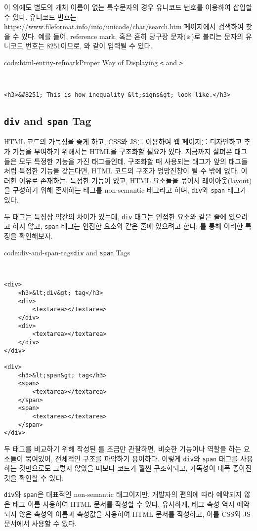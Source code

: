 이 외에도 별도의 개체 이름이 없는 특수문자의 경우 유니코드 번호를 이용하여 삽입할 수 있다. 유니코드 번호는 https://www.fileformat.info/info/unicode/char/search.htm 페이지에서 검색하여 찾을 수 있다. 예를 들어, reference mark, 혹은 흔히 당구장 문자(※)로 불리는 문자의 유니코드 번호는 8251이므로, 와 같이 입력될 수 있다.

\begin{codeenv}{code:html-entity-refmark}{Proper Way of Displaying \texttt{<} and \texttt{>}}\begin{verbatim}


<h3>&#8251; This is how inequality &lt;signs&gt; look like.</h3>
\end{verbatim}
\end{codeenv}

\subsection*{\texttt{div} and \texttt{span} Tag}
HTML 코드의 가독성을 좋게 하고, CSS와 JS를 이용하여 웹 페이지를 디자인하고 추가 기능을 부여하기 위해서는 HTML을 구조화할 필요가 있다. 지금까지 살펴본 태그들은 모두 특정한 기능을 가진 태그들인데, 구조화할 때 사용되는 태그가 앞의 태그들처럼 특정한 기능을 갖는다면, HTML 코드의 구조가 엉망진창이 될 수 밖에 없다. 이러한 이유로 존재하는, 특정한 기능이 없고, HTML 요소들을 묶어서 레이아웃(layout)을 구성하기 위해 존재하는 태그를 non-semantic 태그라고 하며, \verb|div|와 \verb|span| 태그가 있다. 

두 태그는 특징상 약간의 차이가 있는데, \verb|div| 태그는 인접한 요소와 같은 줄에 있으려고 하지 않고, \verb|span| 태그는 인접한 요소와 같은 줄에 있으려고 한다. 를 통해 이러한 특징을 확인해보자.

\begin{codeenv}{code:div-and-span-tags}{\texttt{div} and \texttt{span} Tags}\begin{verbatim}


<div>
    <h3>&lt;div&gt; tag</h3>
    <div>
        <textarea></textarea>
    </div>
    <div>
        <textarea></textarea>
    </div>
</div>

<div>
    <h3>&lt;span&gt; tag</h3>
    <span>
        <textarea></textarea>
    </span>
    <span>
        <textarea></textarea>
    </span>
</div>
\end{verbatim}
\end{codeenv}

두 태그를 비교하기 위해 작성된 를 조금만 관찰하면, 비슷한 기능이나 역할을 하는 요소들이 묶여있어, 전체적인 구조를 파악하기 용이하다. 이렇게 \texttt{div}와 \texttt{span} 태그를 사용하는 것만으로도 그렇지 않았을 때보다 코드가 훨씬 구조화되고, 가독성이 대폭 좋아진 것을 확인할 수 있다. 

\texttt{div}와 \texttt{span}은 대표적인 non-semantic 태그이지만, 개발자의 편의에 따라 예약되지 않은 태그 이름 사용하여 HTML 문서를 작성할 수 있다. 유사하게, 태그 속성 역시 예약되지 않은 속성의 이름과 속성값을 사용하여 HTML 문서를 작성하고, 이를 CSS와 JS 문서에서 사용할 수 있다.
